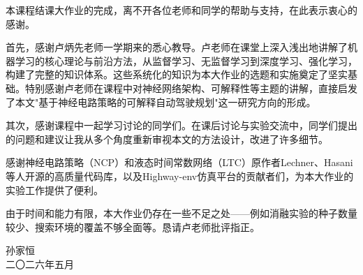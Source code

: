 \xiaosi\song

本课程结课大作业的完成，离不开各位老师和同学的帮助与支持，在此表示衷心的感谢。

首先，感谢卢炳先老师一学期来的悉心教导。卢老师在课堂上深入浅出地讲解了机器学习的核心理论与前沿方法，从监督学习、无监督学习到深度学习、强化学习，构建了完整的知识体系。这些系统化的知识为本大作业的选题和实施奠定了坚实基础。特别感谢卢老师在课程中对神经网络架构、可解释性等主题的讲解，直接启发了本文"基于神经电路策略的可解释自动驾驶规划"这一研究方向的形成。

其次，感谢课程中一起学习讨论的同学们。在课后讨论与实验交流中，同学们提出的问题和建议让我从多个角度重新审视本文的方法设计，改进了许多细节。

感谢神经电路策略（NCP）和液态时间常数网络（LTC）原作者Lechner、Hasani等人开源的高质量代码库，以及Highway-env仿真平台的贡献者们，为本大作业的实验工作提供了便利。

由于时间和能力有限，本大作业仍存在一些不足之处——例如消融实验的种子数量较少、搜索环境的覆盖不够全面等。恳请卢老师批评指正。

\begin{flushright}
\song\xiaosi
孙家恒\\
二〇二六年五月
\end{flushright}
